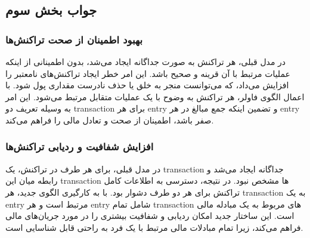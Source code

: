 \subsection*{جواب بخش سوم}

\subsubsection*{بهبود اطمینان از صحت تراکنش‌ها}
در مدل قبلی، هر تراکنش به صورت جداگانه ایجاد می‌شد، بدون اطمینانی از اینکه عملیات مرتبط با آن قرینه و صحیح باشد. این امر خطر ایجاد تراکنش‌های نامعتبر را افزایش می‌داد، که می‌توانست منجر به خلق یا حذف نادرست مقداری پول شود. با اعمال الگوی فاولر، هر تراکنش به وضوح با یک عملیات متقابل مرتبط می‌شود. این امر به وسیله تعریف دو transaction برای هر entry و تضمین اینکه جمع مبالغ در هر entry صفر باشد، اطمینان از صحت و تعادل مالی را فراهم می‌کند.


\subsubsection*{افزایش شفافیت و ردیابی تراکنش‌ها}

در مدل قبلی، برای هر طرف در تراکنش، یک transaction جداگانه ایجاد می‌شد و رابطه میان این transaction‌ ها مشخص نبود. در نتیجه، دسترسی به اطلاعات کامل تراکنش برای هر دو طرف دشوار بود. با به کارگیری الگوی جدید، هر transaction به یک entry مرتبط است و هر entry شامل تمام transaction‌ های مربوط به یک مبادله مالی است. این ساختار جدید امکان ردیابی و شفافیت بیشتری را در مورد جریان‌های مالی فراهم می‌کند، زیرا تمام مبادلات مالی مرتبط با یک فرد به راحتی قابل شناسایی است.